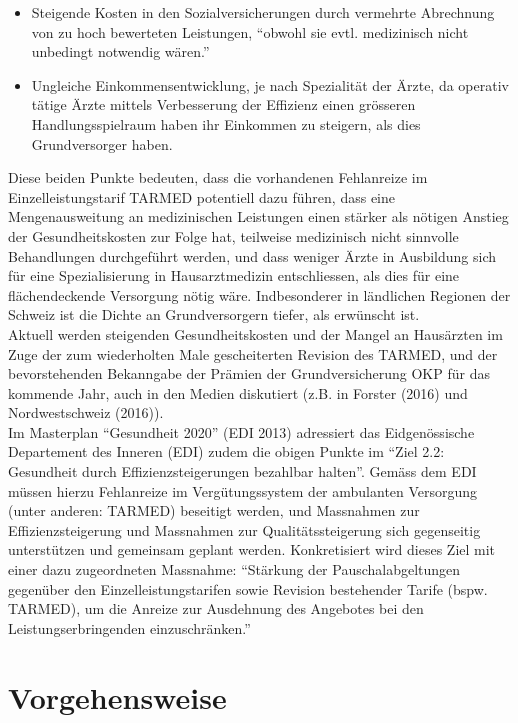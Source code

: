 \documentclass[ngerman,a4paper]{article}
\providecommand{\tightlist}{%
  \setlength{\itemsep}{0pt}\setlength{\parskip}{0pt}}
\begin{document}
\begin{itemize}
\tightlist
\item
  Steigende Kosten in den Sozialversicherungen durch vermehrte
  Abrechnung von zu hoch bewerteten Leistungen, ``obwohl sie evtl.
  medizinisch nicht unbedingt notwendig wären.''
\item
  Ungleiche Einkommensentwicklung, je nach Spezialität der Ärzte, da
  operativ tätige Ärzte mittels Verbesserung der Effizienz einen
  grösseren Handlungsspielraum haben ihr Einkommen zu steigern, als dies
  Grundversorger haben.
\end{itemize}

Diese beiden Punkte bedeuten, dass die vorhandenen Fehlanreize im
Einzelleistungstarif TARMED potentiell dazu führen, dass eine
Mengenausweitung an medizinischen Leistungen einen stärker als nötigen
Anstieg der Gesundheitskosten zur Folge hat, teilweise medizinisch nicht
sinnvolle Behandlungen durchgeführt werden, und dass weniger Ärzte in
Ausbildung sich für eine Spezialisierung in Hausarztmedizin
entschliessen, als dies für eine flächendeckende Versorgung nötig wäre.
Indbesonderer in ländlichen Regionen der Schweiz ist die Dichte an
Grundversorgern tiefer, als erwünscht ist.\\
Aktuell werden steigenden Gesundheitskosten und der Mangel an Hausärzten
im Zuge der zum wiederholten Male gescheiterten Revision des TARMED, und
der bevorstehenden Bekanngabe der Prämien der Grundversicherung OKP für
das kommende Jahr, auch in den Medien diskutiert (z.B. in Forster (2016)
und Nordwestschweiz (2016)).\\
Im Masterplan ``Gesundheit 2020'' (EDI 2013) adressiert das
Eidgenössische Departement des Inneren (EDI) zudem die obigen Punkte im
``Ziel 2.2: Gesundheit durch Effizienzsteigerungen bezahlbar halten''.
Gemäss dem EDI müssen hierzu Fehlanreize im Vergütungssystem der
ambulanten Versorgung (unter anderen: TARMED) beseitigt werden, und
Massnahmen zur Effizienzsteigerung und Massnahmen zur
Qualitätssteigerung sich gegenseitig unterstützen und gemeinsam geplant
werden. Konkretisiert wird dieses Ziel mit einer dazu zugeordneten
Massnahme: ``Stärkung der Pauschalabgeltungen gegenüber den
Einzelleistungstarifen sowie Revision bestehender Tarife (bspw. TARMED),
um die Anreize zur Ausdehnung des Angebotes bei den
Leistungserbringenden einzuschränken.''

\section{Vorgehensweise}\label{vorgehensweise}
\end{document}
